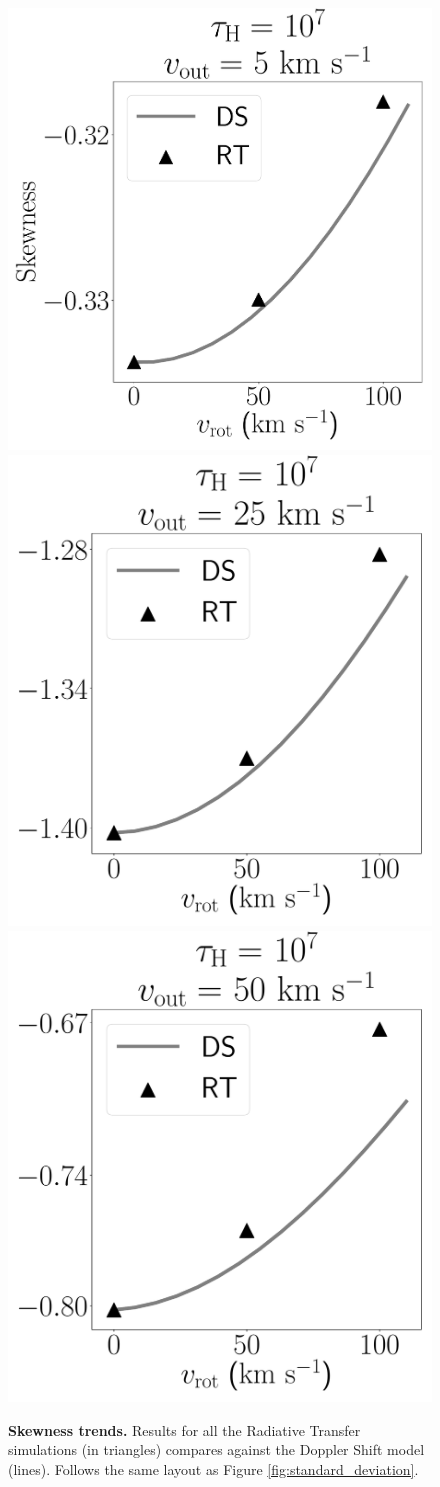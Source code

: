 \documentclass[a4paper,fleqn,usenatbib]{mnras}
\begin{document}
\begin{figure}
\begin{center}
\includegraphics[height=0.25\textwidth]{line_characterization_skw_vout5_logtau7}
\includegraphics[height=0.25\textwidth]{line_characterization_skw_vout25_logtau7}
\includegraphics[height=0.25\textwidth]{line_characterization_skw_vout50_logtau7}
\end{center}
\caption{\textbf{Skewness trends.} Results for all the
  Radiative Transfer simulations (in triangles) compares against the
  Doppler Shift model (lines).
  Follows the same layout as Figure \ref{fig:standard_deviation}. 
  \label{fig:skewness}}
\end{figure}
\end{document}
